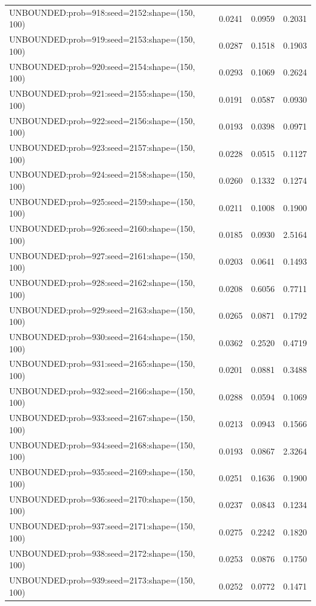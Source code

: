 \begin{longtable}{lccc}
UNBOUNDED:prob=918:seed=2152:shape=(150, 100) &   0.0241 &  0.0959 &  0.2031 \\
UNBOUNDED:prob=919:seed=2153:shape=(150, 100) &   0.0287 &  0.1518 &  0.1903 \\
UNBOUNDED:prob=920:seed=2154:shape=(150, 100) &   0.0293 &  0.1069 &  0.2624 \\
UNBOUNDED:prob=921:seed=2155:shape=(150, 100) &   0.0191 &  0.0587 &  0.0930 \\
UNBOUNDED:prob=922:seed=2156:shape=(150, 100) &   0.0193 &  0.0398 &  0.0971 \\
UNBOUNDED:prob=923:seed=2157:shape=(150, 100) &   0.0228 &  0.0515 &  0.1127 \\
UNBOUNDED:prob=924:seed=2158:shape=(150, 100) &   0.0260 &  0.1332 &  0.1274 \\
UNBOUNDED:prob=925:seed=2159:shape=(150, 100) &   0.0211 &  0.1008 &  0.1900 \\
UNBOUNDED:prob=926:seed=2160:shape=(150, 100) &   0.0185 &  0.0930 &  2.5164 \\
UNBOUNDED:prob=927:seed=2161:shape=(150, 100) &   0.0203 &  0.0641 &  0.1493 \\
UNBOUNDED:prob=928:seed=2162:shape=(150, 100) &   0.0208 &  0.6056 &  0.7711 \\
UNBOUNDED:prob=929:seed=2163:shape=(150, 100) &   0.0265 &  0.0871 &  0.1792 \\
UNBOUNDED:prob=930:seed=2164:shape=(150, 100) &   0.0362 &  0.2520 &  0.4719 \\
UNBOUNDED:prob=931:seed=2165:shape=(150, 100) &   0.0201 &  0.0881 &  0.3488 \\
UNBOUNDED:prob=932:seed=2166:shape=(150, 100) &   0.0288 &  0.0594 &  0.1069 \\
UNBOUNDED:prob=933:seed=2167:shape=(150, 100) &   0.0213 &  0.0943 &  0.1566 \\
UNBOUNDED:prob=934:seed=2168:shape=(150, 100) &   0.0193 &  0.0867 &  2.3264 \\
UNBOUNDED:prob=935:seed=2169:shape=(150, 100) &   0.0251 &  0.1636 &  0.1900 \\
UNBOUNDED:prob=936:seed=2170:shape=(150, 100) &   0.0237 &  0.0843 &  0.1234 \\
UNBOUNDED:prob=937:seed=2171:shape=(150, 100) &   0.0275 &  0.2242 &  0.1820 \\
UNBOUNDED:prob=938:seed=2172:shape=(150, 100) &   0.0253 &  0.0876 &  0.1750 \\
UNBOUNDED:prob=939:seed=2173:shape=(150, 100) &   0.0252 &  0.0772 &  0.1471 \\

\end{longtable}
